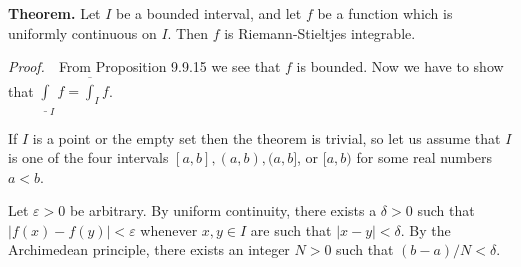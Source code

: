 \documentclass{book}
\newcommand{\pff}{\vspace{.25em}\noindent\emph{Proof.}~~}
\newcommand{\titl}[1]{\noindent\textbf{#1}}
\begin{document}
\begin{framed}
\titl{Theorem.} Let $I$ be a bounded interval, and let $f$ be a function which is uniformly continuous on $I$. Then $f$ is Riemann-Stieltjes integrable.
\end{framed}

\pff From Proposition 9.9.15 we see that $f$ is bounded. Now we have to show that $\underline\int_{I} f = \overline\int_{I} f$.

If $I$ is a point or the empty set then the theorem is trivial, so let us assume that $I$ is one of the four intervals $[a, b], (a, b), (a, b]$, or $[a, b)$ for some real numbers $a < b$.

Let $\varepsilon > 0$ be arbitrary. By uniform continuity, there exists a $\delta > 0$ such that $|f(x) − f(y)| < \varepsilon$ whenever $x, y \in I$ are such that $|x − y| < \delta$. By the Archimedean principle, there exists an integer $N > 0$ such that $(b − a)/N < \delta$.
\end{document}
